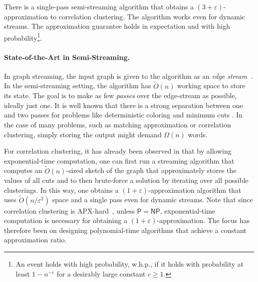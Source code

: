 \documentclass[10pt,a4paper]{article}
\newcommand{\eps}{\ensuremath{\varepsilon}}
\begin{document}
\begin{theorem*}
    There is a single-pass semi-streaming algorithm that obtains a $(3 + \eps)$-approximation to correlation clustering. The algorithm works even for dynamic streams. The approximation guarantee holds in expectation and with high probability\footnote{An event holds with high probability, w.h.p., if it holds with probability at least $1 - n^{-c}$ for a desirably large constant $c \geq 1$.}.
\end{theorem*}


\paragraph{State-of-the-Art in Semi-Streaming.}
In graph streaming, the input graph is given to the algorithm as an \emph{edge stream}~\cite{Feigenbaum2005, Feigenbaum2005a, Mut2005}.
In the semi-streaming setting, the algorithm has $\widetilde{O}(n)$ working space to store its state.
The goal is to make as few \emph{passes} over the edge-stream as possible, ideally just one. It is well known that there is a strong separation between one and two passes for problems like deterministic coloring \cite{assadi2022deterministic} and minimum cuts \cite{AssadiD2021}.
In the case of many problems, such as matching approximation or correlation clustering, simply storing the output might demand $\Omega(n)$ words.

For correlation clustering, it has already been observed in \cite{ahn2015correlation,behnezhad2023single} that by allowing exp\-onential-time computation, one can first run a streaming algorithm that computes an $\widetilde{O}(n)$-sized sketch of the graph that approximately stores the values of all cuts \cite{AGM12} and to then brute-force a solution by iterating over all possible clusterings. 
In this way, one obtains a $(1+\eps)$-approximation algorithm that uses $\widetilde{O}(n/\eps^2)$ space and a single pass even for dynamic streams. Note that since correlation clustering is APX-hard~\cite{charikar2005clustering}, unless $\mathsf{P}=\mathsf{NP}$, exponential-time computation is necessary for obtaining a $(1+\eps)$-approximation. The focus has therefore been on designing polynomial-time algorithms that achieve a constant approximation ratio.
\end{document}
